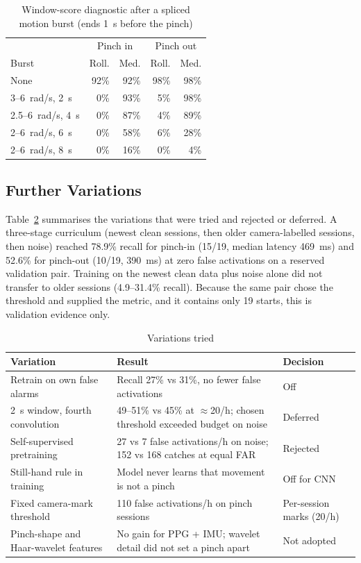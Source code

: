 \begin{table}[t]
  \centering
  \caption{Window-score diagnostic after a spliced motion burst (ends 1~s before the pinch)}
  \label{tab:hangover}
  \small
  \begin{tabular}{@{}lrrrr@{}}
    \toprule
     & \multicolumn{2}{c}{Pinch in} & \multicolumn{2}{c}{Pinch out} \\
    Burst & Roll. & Med. & Roll. & Med. \\
    \midrule
    None & 92\% & 92\% & 98\% & 98\% \\
    3--6~rad/s, 2~s & 0\% & 93\% & 5\% & 98\% \\
    2.5--6~rad/s, 4~s & 0\% & 87\% & 4\% & 89\% \\
    2--6~rad/s, 6~s & 0\% & 58\% & 6\% & 28\% \\
    2--6~rad/s, 8~s & 0\% & 16\% & 0\% & 4\% \\
    \bottomrule
  \end{tabular}
\end{table}

\subsection{Further Variations}

Table~\ref{tab:variations} summarises the variations that were tried and rejected or deferred. A three-stage curriculum (newest clean sessions, then older camera-labelled sessions, then noise) reached 78.9\% recall for pinch-in (15/19, median latency 469~ms) and 52.6\% for pinch-out (10/19, 390~ms) at zero false activations on a reserved validation pair. Training on the newest clean data plus noise alone did not transfer to older sessions (4.9--31.4\% recall). Because the same pair chose the threshold and supplied the metric, and it contains only 19 starts, this is validation evidence only.

\begin{table}[t]
  \centering
  \caption{Variations tried}
  \label{tab:variations}
  \small
  \begin{tabular}{@{}p{}p{}p{}@{}}
    \toprule
    Variation & Result & Decision \\
    \midrule
    Retrain on own false alarms & Recall 27\% vs 31\%, no fewer false activations & Off \\
    2~s window, fourth convolution & 49--51\% vs 45\% at $\approx$20/h; chosen threshold exceeded budget on noise & Deferred \\
    Self-supervised pretraining & 27 vs 7 false activations/h on noise; 152 vs 168 catches at equal FAR & Rejected \\
    Still-hand rule in training & Model never learns that movement is not a pinch & Off for CNN \\
    Fixed camera-mark threshold & 110 false activations/h on pinch sessions & Per-session marks (20/h) \\
    Pinch-shape and Haar-wavelet features & No gain for PPG + IMU; wavelet detail did not set a pinch apart & Not adopted \\
    \bottomrule
  \end{tabular}
\end{table}

